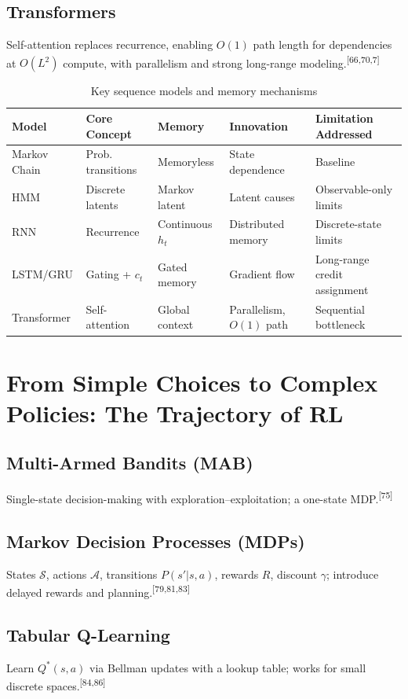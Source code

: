 \documentclass[11pt]{article}
\newcommand{\refnum}[1]{\textsuperscript{[#1]}}
\begin{document}
\subsection{Transformers}
Self-attention replaces recurrence, enabling $O(1)$ path length for dependencies at $O(L^2)$ compute, with parallelism and strong long-range modeling.\refnum{66,70,7}

\begin{table}[h!]
\centering
\caption{Key sequence models and memory mechanisms}
\begin{tabular}{@{}lllll@{}}
\toprule
\textbf{Model} & \textbf{Core Concept} & \textbf{Memory} & \textbf{Innovation} & \textbf{Limitation Addressed} \\
\midrule
Markov Chain & Prob. transitions & Memoryless & State dependence & Baseline \\
HMM & Discrete latents & Markov latent & Latent causes & Observable-only limits \\
RNN & Recurrence & Continuous $h_t$ & Distributed memory & Discrete-state limits \\
LSTM/GRU & Gating + $c_t$ & Gated memory & Gradient flow & Long-range credit assignment \\
Transformer & Self-attention & Global context & Parallelism, $O(1)$ path & Sequential bottleneck \\
\bottomrule
\end{tabular}
\end{table}

\section{From Simple Choices to Complex Policies: The Trajectory of RL}

\subsection{Multi-Armed Bandits (MAB)}
Single-state decision-making with exploration--exploitation; a one-state MDP.\refnum{75}

\subsection{Markov Decision Processes (MDPs)}
States $\mathcal{S}$, actions $\mathcal{A}$, transitions $P(s'|s,a)$, rewards $R$, discount $\gamma$; introduce delayed rewards and planning.\refnum{79,81,83}

\subsection{Tabular Q-Learning}
Learn $Q^*(s,a)$ via Bellman updates with a lookup table; works for small discrete spaces.\refnum{84,86}
\end{document}
